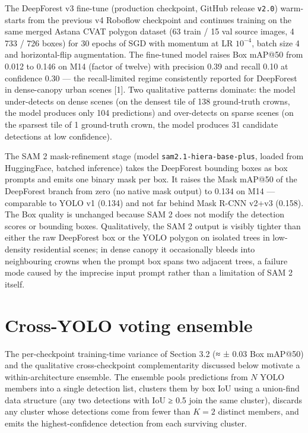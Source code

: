 The DeepForest v3 fine-tune (production checkpoint, GitHub release \texttt{v2.0}) warm-starts from the previous v4 Roboflow checkpoint and continues training on the same merged Astana CVAT polygon dataset (63 train / 15 val source images, 4 733 / 726 boxes) for 30 epochs of SGD with momentum at LR \(10^{-4}\), batch size 4 and horizontal-flip augmentation. The fine-tuned model raises Box mAP@50 from 0.012 to 0.146 on M14 (factor of twelve) with precision 0.39 and recall 0.10 at confidence 0.30 --- the recall-limited regime consistently reported for DeepForest in dense-canopy urban scenes {[}1{]}. Two qualitative patterns dominate: the model under-detects on dense scenes (on the densest tile of 138 ground-truth crowns, the model produces only 104 predictions) and over-detects on sparse scenes (on the sparsest tile of 1 ground-truth crown, the model produces 31 candidate detections at low confidence).

The SAM 2 mask-refinement stage (model \texttt{sam2.1-hiera-base-plus}, loaded from HuggingFace, batched inference) takes the DeepForest bounding boxes as box prompts and emits one binary mask per box. It raises the Mask mAP@50 of the DeepForest branch from zero (no native mask output) to 0.134 on M14 --- comparable to YOLO v1 (0.134) and not far behind Mask R-CNN v2+v3 (0.158). The Box quality is unchanged because SAM 2 does not modify the detection scores or bounding boxes. Qualitatively, the SAM 2 output is visibly tighter than either the raw DeepForest box or the YOLO polygon on isolated trees in low-density residential scenes; in dense canopy it occasionally bleeds into neighbouring crowns when the prompt box spans two adjacent trees, a failure mode caused by the imprecise input prompt rather than a limitation of SAM 2 itself.

\section{Cross-YOLO voting ensemble}\label{cross-yolo-voting-ensemble}

The per-checkpoint training-time variance of Section 3.2 (≈ ± 0.03 Box mAP@50) and the qualitative cross-checkpoint complementarity discussed below motivate a within-architecture ensemble. The ensemble pools predictions from \(N\) YOLO members into a single detection list, clusters them by box IoU using a union-find data structure (any two detections with IoU ≥ 0.5 join the same cluster), discards any cluster whose detections come from fewer than \(K = 2\) distinct members, and emits the highest-confidence detection from each surviving cluster.

